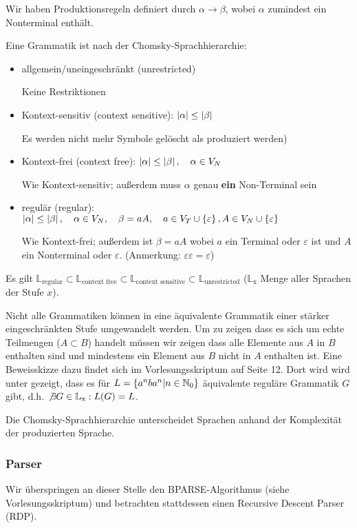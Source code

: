 Wir haben Produktionsregeln definiert durch $\alpha \to \beta$, wobei
$\alpha$ zumindest ein Nonterminal enthält.
\begin{defn}
Eine Grammatik ist nach der Chomsky-Sprachhierarchie:
\begin{itemize}
\item allgemein/uneingeschränkt (unrestricted)

Keine Restriktionen
\item Kontext-sensitiv (context sensitive): $\left\lvert{\alpha}\right\rvert \leq \left\lvert{\beta}\right\rvert$

Es werden nicht mehr Symbole gelöscht als produziert werden)
\item Kontext-frei (context free): $\left\lvert{\alpha}\right\rvert \leq \left\lvert{\beta}\right\rvert, \quad \alpha \in V_N$

Wie Kontext-sensitiv; außerdem muss $\alpha$ genau \textbf{ein} Non-Terminal sein
\item regulär (regular): $\left\lvert{\alpha}\right\rvert \leq \left\lvert{\beta}\right\rvert, \quad \alpha \in V_N, \quad \beta=aA, \quad a \in V_T \cup \left\{\varepsilon\right\}, A \in V_N \cup \left\{\varepsilon\right\}$

Wie Kontext-frei; außerdem ist $\beta=aA$ wobei $a$ ein Terminal oder $\varepsilon$ ist und $A$ ein Nonterminal oder $\varepsilon$. (Anmerkung: $\varepsilon\varepsilon=\varepsilon$)
\end{itemize}
Es gilt $\mathbb{L}_{\text{regular}} \subset \mathbb{L}_{\text{context free}} \subset \mathbb{L}_{\text{context sensitive}} \subset \mathbb{L}_{\text{unrestricted}}$ ($\mathbb{L}_{\text{x}}$ Menge aller Sprachen der Stufe $x$).
\end{defn}

Nicht alle Grammatiken können in eine äquivalente Grammatik einer stärker eingeschränkten Stufe umgewandelt werden. Um zu zeigen dass es sich um echte Teilmengen ($A \subset B$) handelt müssen wir zeigen dass alle Elemente aus $A$ in $B$ enthalten sind und mindestens ein Element aus $B$ nicht in $A$ enthalten ist.
Eine Beweisskizze dazu findet sich im Vorlesungsskriptum auf Seite 12. Dort wird wird unter gezeigt, dass es für $L=\left\{a^n b a^n|n \in \mathbb{N}_0\right\}$ äquivalente reguläre Grammatik $G$ gibt, d.h. $\not \exists G \in \mathbb{L}_{\text{x}} : L(G) = L$.

Die Chomsky-Sprachhierarchie unterscheidet Sprachen anhand der Komplexität der produzierten Sprache.

\subsubsection{Parser}
Wir überspringen an dieser Stelle den BPARSE-Algorithmus (siehe Vorlesungsskriptum) und betrachten stattdessen
einen Recursive Descent Parser (RDP).

